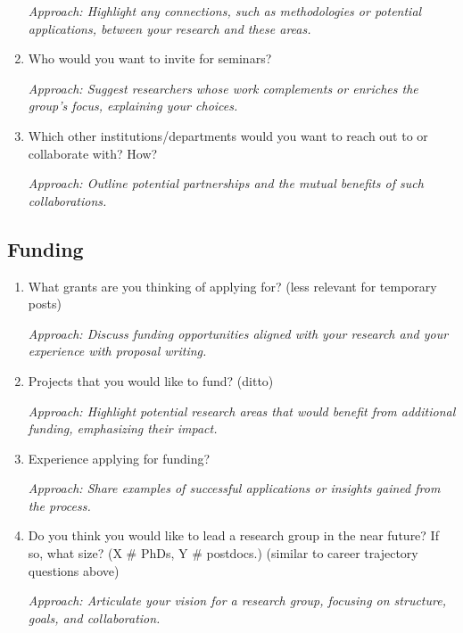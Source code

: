 \documentclass[12pt]{article}
\numberwithin{equation}{section}
\begin{document}
\begin{enumerate}
    \textit{Approach: Highlight any connections, such as methodologies or potential applications, between your research and these areas.}

    \item Who would you want to invite for seminars?
    
    \textit{Approach: Suggest researchers whose work complements or enriches the group’s focus, explaining your choices.}

    \item Which other institutions/departments would you want to reach out to or collaborate with? How?
    
    \textit{Approach: Outline potential partnerships and the mutual benefits of such collaborations.}
\end{enumerate}

\subsection{Funding}
\begin{enumerate}
    \item What grants are you thinking of applying for? (less relevant for temporary posts)
    
    \textit{Approach: Discuss funding opportunities aligned with your research and your experience with proposal writing.}

    \item Projects that you would like to fund? (ditto)
    
    \textit{Approach: Highlight potential research areas that would benefit from additional funding, emphasizing their impact.}

    \item Experience applying for funding?
    
    \textit{Approach: Share examples of successful applications or insights gained from the process.}

    \item Do you think you would like to lead a research group in the near future? If so, what size? (X \# PhDs, Y \# postdocs.) (similar to career trajectory questions above)
    
    \textit{Approach: Articulate your vision for a research group, focusing on structure, goals, and collaboration.}
\end{enumerate}
\end{document}
